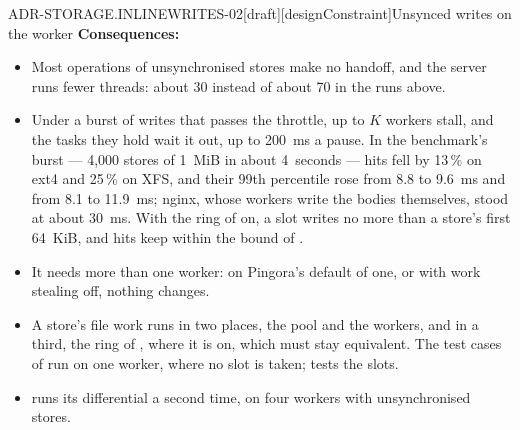 \begin{requirement}{ADR-STORAGE.INLINEWRITES-02}[draft][designConstraint]{Unsynced writes on the worker}
  \textbf{Consequences:}
  \begin{itemize}
    \item[+] Most operations of unsynchronised stores make no handoff, and
      the server runs fewer threads: about 30 instead of about 70 in the
      runs above.
    \item[--] Under a burst of writes that passes the throttle, up to $K$
      workers stall, and the tasks they hold wait it out, up to 200~ms a
      pause. In the benchmark's burst --- 4,000 stores of 1~MiB in about
      4~seconds --- hits fell by 13\,\% on ext4 and 25\,\% on XFS, and
      their 99th percentile rose from 8.8 to 9.6~ms and from 8.1 to 11.9~ms;
      nginx, whose workers write the bodies themselves, stood at about
      30~ms. With the ring of  on, a slot
      writes no more than a store's first 64~KiB, and hits keep within the
      bound of .
    \item[--] It needs more than one worker: on Pingora's default of one,
      or with work stealing off, nothing changes.
    \item[--] A store's file work runs in two places, the pool and the
      workers, and in a third, the ring of ,
      where it is on, which must stay equivalent. The test cases of
       run on one worker, where no slot is
      taken;  tests the slots.
    \item[--]  runs its differential a second
      time, on four workers with unsynchronised stores.
  \end{itemize}



\end{requirement}

